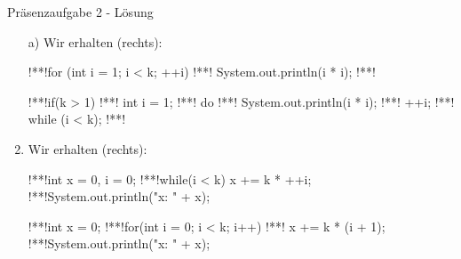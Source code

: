 \begin{frame}[t,fragile]{Präsenzaufgabe 2 - Lösung}
\begin{enumerate}[<+(1)->]
    \item[a)] Wir erhalten (rechts):\\
    \begin{minipage}{0.5\linewidth}
\begin{plainjava}
!**!for (int i = 1; i < k; ++i) {
!**!    System.out.println(i * i);
!**!}
\end{plainjava}
    \end{minipage}\hfill\begin{minipage}{0.45\linewidth}
\begin{plainjava}
!**!if(k > 1) {
!**!    int i = 1;
!**!    do {
!**!        System.out.println(i * i);
!**!        ++i;
!**!    } while (i < k);
!**!}
        \end{plainjava}
    \end{minipage}
    \item<8->[b)] Wir erhalten (rechts):\\
        \begin{minipage}{0.5\linewidth}
\begin{plainjava}
!**!int x = 0, i = 0;
!**!while(i < k) { x += k * ++i; }
!**!System.out.println("x: " + x);
\end{plainjava}
    \end{minipage}\hfill\begin{minipage}{0.45\linewidth}
\begin{plainjava}
!**!int x = 0;
!**!for(int i = 0; i < k; i++)
!**!    x += k * (i + 1);
!**!System.out.println("x: " + x);
        \end{plainjava}
    \end{minipage}
\end{enumerate}
\end{frame}


